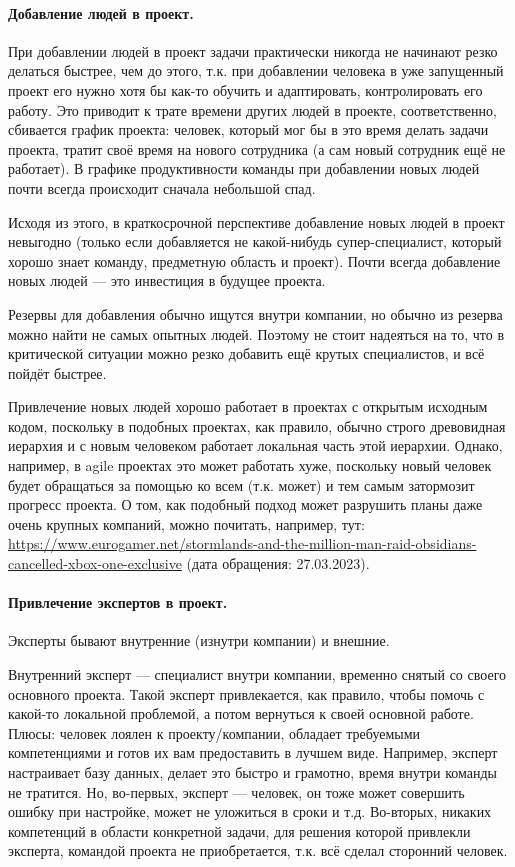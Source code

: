 \documentclass{../../text-style}
\begin{document}
\paragraph{Добавление людей в проект.} При добавлении людей в проект задачи практически никогда не начинают резко делаться быстрее, чем до этого, т.к. при добавлении человека в уже запущенный проект его нужно хотя бы как-то обучить и адаптировать, контролировать его работу. Это приводит к трате времени других людей в проекте, соответственно, сбивается график проекта: человек, который мог бы в это время делать задачи проекта, тратит своё время на нового сотрудника (а сам новый сотрудник ещё не работает). В графике продуктивности команды при добавлении новых людей почти всегда происходит сначала небольшой спад.

Исходя из этого, в краткосрочной перспективе добавление новых людей в проект невыгодно (только если добавляется не какой-нибудь супер-специалист, который хорошо знает команду, предметную область и проект). Почти всегда добавление новых людей --- это инвестиция в будущее проекта.

Резервы для добавления обычно ищутся внутри компании, но обычно из резерва можно найти не самых опытных людей. Поэтому не стоит надеяться на то, что в критической ситуации можно резко добавить ещё крутых специалистов, и всё пойдёт быстрее.

Привлечение новых людей хорошо работает в проектах с открытым исходным кодом, поскольку в подобных проектах, как правило, обычно строго древовидная иерархия и с новым человеком работает локальная часть этой иерархии. Однако, например, в agile проектах это может работать хуже, поскольку новый человек будет обращаться за помощью ко всем (т.к. может) и тем самым затормозит прогресс проекта. О том, как подобный подход может разрушить планы даже очень крупных компаний, можно почитать, например, тут: \url{https://www.eurogamer.net/stormlands-and-the-million-man-raid-obsidians-cancelled-xbox-one-exclusive} (дата обращения: 27.03.2023).

\paragraph{Привлечение экспертов в проект.} Эксперты бывают внутренние (изнутри компании) и внешние.

Внутренний эксперт --- специалист внутри компании, временно снятый со своего основного проекта. Такой эксперт привлекается, как правило, чтобы помочь с какой-то локальной проблемой, а потом вернуться к своей основной работе. Плюсы: человек лоялен к проекту/компании, обладает требуемыми компетенциями и готов их вам предоставить в лучшем виде. Например, эксперт настраивает базу данных, делает это быстро и грамотно, время внутри команды не тратится. Но, во-первых, эксперт --- человек, он тоже может совершить ошибку при настройке, может не уложиться в сроки и т.д. Во-вторых, никаких компетенций в области конкретной задачи, для решения которой привлекли эксперта, командой проекта не приобретается, т.к. всё сделал сторонний человек.
\end{document}
